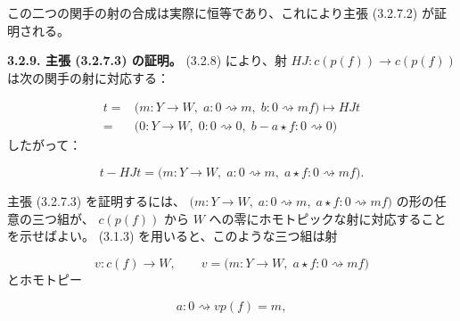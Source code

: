 この二つの関手の射の合成は実際に恒等であり、これにより主張
(3.2.7.2) が証明される。

\noindent\textbf{3.2.9. 主張 (3.2.7.3) の証明。}\quad
{}
(3.2.8) により、射
$HJ\colon c(p(f))\longrightarrow c(p(f))$ は次の関手の射に対応する：

\begin{equation}
  \begin{aligned}
    t={}&\bigl(m\colon Y\longrightarrow W,\;
      a\colon0\rightsquigarrow m,\;
      b\colon0\rightsquigarrow mf\bigr)
      \longmapsto HJt\\
    ={}&\bigl(0\colon Y\longrightarrow W,\;
      0\colon0\rightsquigarrow0,\;
      b-a\star f\colon0\rightsquigarrow0\bigr)
  \end{aligned}
  \tag{3.2.9.1}
\end{equation}
したがって：

\begin{equation}
  t-HJt=\bigl(m\colon Y\longrightarrow W,\;
    a\colon0\rightsquigarrow m,\;
    a\star f\colon0\rightsquigarrow mf\bigr).
  \tag{3.2.9.2}
\end{equation}

主張 (3.2.7.3) を証明するには、
$\bigl(m\colon Y\longrightarrow W,\;a\colon0\rightsquigarrow m,\;
a\star f\colon0\rightsquigarrow mf\bigr)$ の形の任意の三つ組が、
$c(p(f))$ から $W$ への零にホモトピックな射に対応することを示せばよい。
(3.1.3) を用いると、このような三つ組は射

\begin{equation}
  v\colon c(f)\longrightarrow W,
  \qquad
  v=\bigl(m\colon Y\longrightarrow W,\;
    a\star f\colon0\rightsquigarrow mf\bigr)
  \tag{3.2.9.3}
\end{equation}
とホモトピー

\begin{equation}
  a\colon0\rightsquigarrow vp(f)=m,
  \tag{3.2.9.4}
\end{equation}

